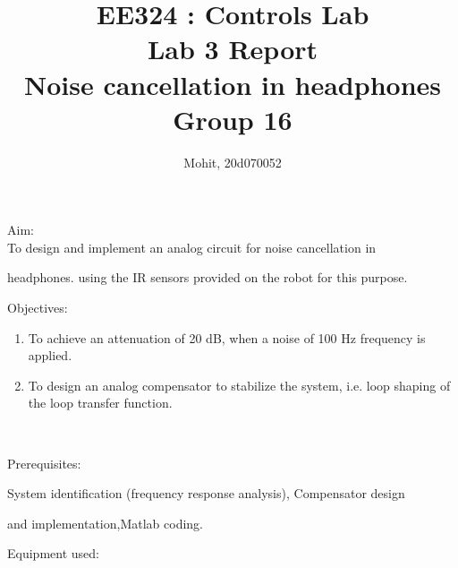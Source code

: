\documentclass[12pt]{report}
\begin{document}
\author{Mohit, 20d070052 }
\title{ EE324 : Controls Lab \\ Lab 3 Report \\Noise cancellation in headphones\\Group 16}
\maketitle

\newpage

\begin{Large}
Aim:\\

To design and implement an analog circuit for noise cancellation in

headphones. using the IR sensors provided on the robot for this purpose.\\

\vspace{15pt}

\begin{Large}
Objectives:\\
\end{Large}
\begin{enumerate}
    \item To achieve an attenuation of 20 dB, when a noise of 100 Hz frequency is applied.
    \item To design an analog compensator to stabilize the system, i.e. loop shaping of the loop
transfer function.\\
\end{enumerate}

\\


\vspace{15pt}

\begin{Large}
Prerequisites:\\
\end{Large}

System identification (frequency response analysis), Compensator design 

and implementation,Matlab coding.\\

\vspace{15pt}

\begin{Large}

Equipment used:\\
\end{Large}



\end{Large}
\end{document}
